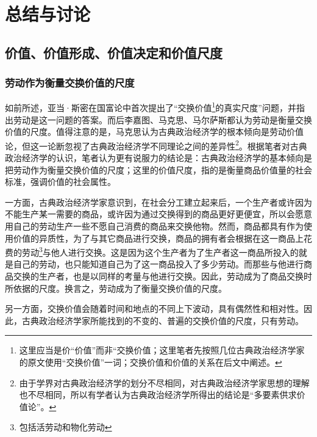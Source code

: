 \chapter{总结与讨论}

\section{价值、价值形成、价值决定和价值尺度}

\subsection{劳动作为衡量交换价值的尺度}

如前所述，亚当·斯密在国富论中首次提出了“交换价值\footnote{这里应当是价“价值”而非“交换价值；这里笔者先按照几位古典政治经济学家的原文使用“交换价值”一词；交换价值和价值的关系在后文中阐述。}的真实尺度”问题，并指出劳动是这一问题的答案。而后李嘉图、马克思、马尔萨斯都认为劳动是衡量交换价值的尺度。值得注意的是，马克思认为古典政治经济学的根本倾向是劳动价值论，但这一论断忽视了古典政治经济学不同理论之间的差异性\footnote{由于学界对古典政治经济学的划分不尽相同，对古典政治经济学家思想的理解也不尽相同，所以有学者认为古典政治经济学所得出的结论是“多要素供求价值论”\cite[179]{CaiJiMingCongGuDianZhengZhiJingJiXueDaoZhongGuoTeSeSheHuiZhuYiZhengZhiJingJiXueJiYuZhongGuoShiJiaoDeZhengZhiJingJiXueYanBianShangCe2023}。}。根据笔者对古典政治经济学的认识，笔者认为更有说服力的结论是：古典政治经济学的基本倾向是把劳动作为衡量交换价值的尺度；这里的价值尺度，指的是衡量商品价值量的社会标准，强调价值的社会属性。

一方面，古典政治经济学家意识到，在社会分工建立起来后，一个生产者或许因为不能生产某一需要的商品，或许因为通过交换得到的商品更好更便宜，所以会愿意用自己的劳动生产一些不愿自己消费的商品来交换他物。然而，商品都具有作为使用价值的异质性，为了与其它商品进行交换，商品的拥有者会根据在这一商品上花费的劳动\footnote{包括活劳动和物化劳动}与他人进行交换。这是因为这个生产者为了生产者这一商品所投入的就是自己的劳动，也只能知道自己为了这一商品投入了多少劳动。而那些与他进行商品交换的生产者，也是以同样的考量与他进行交换。因此，劳动成为了商品交换时所依据的尺度。换言之，劳动成为了衡量交换价值的尺度。\cite[1016-1017]{ZhongGongZhongYangMaKeSiEnGeSiLieNingSiDaLinZhuZuoBianYiJuMaKeSiEnGeSiWenJiDi7Juan2009}\cite[25]{YaDang*SiMiGuoFuLun2015}\cite[133]{MaErSaSiZhengZhiJingJiXueDingYi2023}

另一方面，交换价值会随着时间和地点的不同上下波动，具有偶然性和相对性。因此，古典政治经济学家所能找到的不变的、普遍的交换价值的尺度，只有劳动。\cite[49-51]{ZhongGongZhongYangMaKeSiEnGeSiLieNingSiDaLinZhuZuoBianYiJuMaKeSiEnGeSiWenJiDi5Juan2009}\cite[28-30]{YaDang*SiMiGuoFuLun2015}

